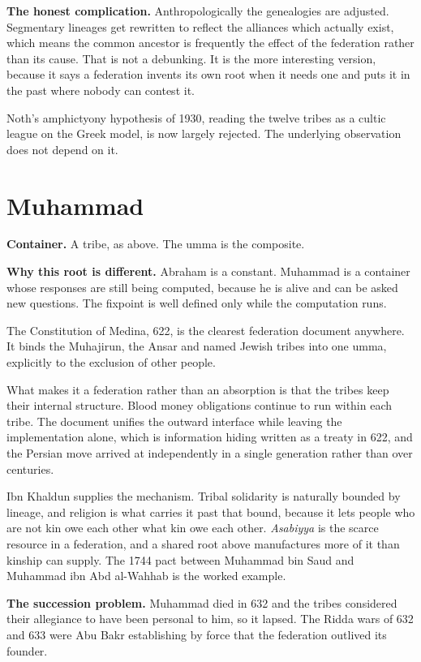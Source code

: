 \documentclass[11pt,a4paper]{article}
\begin{document}
\textbf{The honest complication.} Anthropologically the genealogies are adjusted.
Segmentary lineages get rewritten to reflect the alliances which actually exist,
which means the common ancestor is frequently the effect of the federation rather
than its cause. That is not a debunking. It is the more interesting version,
because it says a federation invents its own root when it needs one and puts it in
the past where nobody can contest it.

Noth's amphictyony hypothesis of 1930, reading the twelve tribes as a cultic league
on the Greek model, is now largely rejected. The underlying observation does not
depend on it.

\section{Muhammad}

\begin{sectionbox}
\textbf{Container.} A tribe, as above. The umma is the composite.

\textbf{Why this root is different.} Abraham is a constant. Muhammad is a container
whose responses are still being computed, because he is alive and can be asked new
questions. The fixpoint is well defined only while the computation runs.
\end{sectionbox}

The Constitution of Medina, 622, is the clearest federation document anywhere. It
binds the Muhajirun, the Ansar and named Jewish tribes into one umma, explicitly to
the exclusion of other people.

What makes it a federation rather than an absorption is that the tribes keep their
internal structure. Blood money obligations continue to run within each tribe. The
document unifies the outward interface while leaving the implementation alone,
which is information hiding written as a treaty in 622, and the Persian move
arrived at independently in a single generation rather than over centuries.

Ibn Khaldun supplies the mechanism. Tribal solidarity is naturally bounded by
lineage, and religion is what carries it past that bound, because it lets people
who are not kin owe each other what kin owe each other. \emph{Asabiyya} is the
scarce resource in a federation, and a shared root above manufactures more of it
than kinship can supply. The 1744 pact between Muhammad bin Saud and Muhammad ibn
Abd al-Wahhab is the worked example.

\textbf{The succession problem.} Muhammad died in 632 and the tribes considered
their allegiance to have been personal to him, so it lapsed. The Ridda wars of 632
and 633 were Abu Bakr establishing by force that the federation outlived its
founder.
\end{document}
